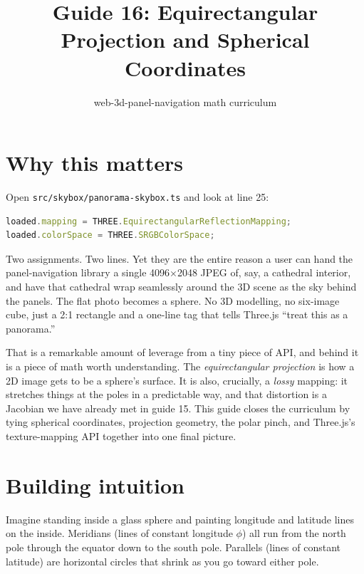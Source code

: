 \documentclass{article}
\title{Guide 16: Equirectangular Projection and Spherical Coordinates}
\author{web-3d-panel-navigation math curriculum}
\date{}
\begin{document}
\maketitle

\section{Why this matters}

Open \texttt{src/skybox/panorama-skybox.ts} and look at line 25:

\begin{lstlisting}[language=JavaScript]
loaded.mapping = THREE.EquirectangularReflectionMapping;
loaded.colorSpace = THREE.SRGBColorSpace;
\end{lstlisting}

Two assignments. Two lines. Yet they are the entire reason a user can hand the
panel-navigation library a single 4096$\times$2048 JPEG of, say, a cathedral
interior, and have that cathedral wrap seamlessly around the 3D scene as the
sky behind the panels. The flat photo becomes a sphere. No 3D modelling, no
six-image cube, just a 2:1 rectangle and a one-line tag that tells Three.js
``treat this as a panorama.''

That is a remarkable amount of leverage from a tiny piece of API, and behind
it is a piece of math worth understanding. The \emph{equirectangular
projection} is how a 2D image gets to be a sphere's surface. It is also,
crucially, a \emph{lossy} mapping: it stretches things at the poles in a
predictable way, and that distortion is a Jacobian we have already met in
guide 15. This guide closes the curriculum by tying spherical coordinates,
projection geometry, the polar pinch, and Three.js's texture-mapping API
together into one final picture.

\section{Building intuition}

Imagine standing inside a glass sphere and painting longitude and latitude
lines on the inside. Meridians (lines of constant longitude $\phi$) all run
from the north pole through the equator down to the south pole. Parallels
(lines of constant latitude) are horizontal circles that shrink as you go
toward either pole.
\end{document}
